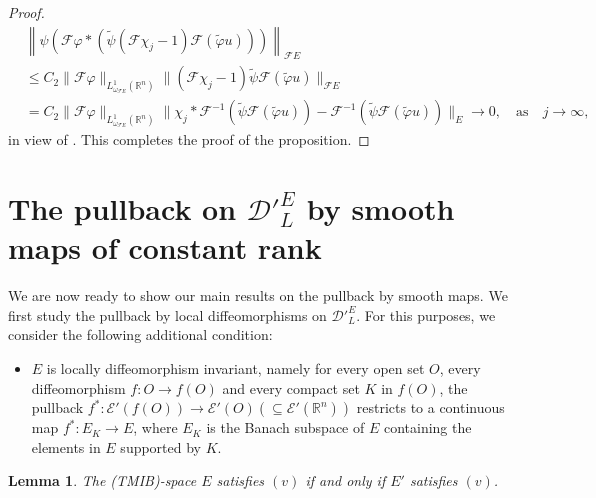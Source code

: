 \documentclass[12pt,reqno]{amsart}
\newcommand{\RR}{\mathbb R}
\newcommand{\EE}{\mathcal E}
\newcommand{\DD}{\mathcal D}
\theoremstyle{plain}
\newtheorem{lemma}[theorem]{Lemma}
\theoremstyle{remark}
\theoremstyle{definition}
\numberwithin{equation}{section}
\begin{document}
\begin{proof}
\begin{align*}
&\left\|\psi\left(\mathcal{F}\varphi*\left(\widetilde{\psi}(\mathcal{F}\chi_j-1) \mathcal{F}(\widetilde{\varphi}u)\right)\right)\right\|_{\mathcal{F}E}\\
&\leq C_2\|\mathcal{F}\varphi\|_{L^1_{\omega_{\mathcal{F}E}}(\RR^n)} \|(\mathcal{F}\chi_j-1)\widetilde{\psi}\mathcal{F}(\widetilde{\varphi}u)\|_{\mathcal{F}E}\\
&=C_2\|\mathcal{F}\varphi\|_{L^1_{\omega_{\mathcal{F}E}}(\RR^n)} \|\chi_j*\mathcal{F}^{-1}(\widetilde{\psi}\mathcal{F}(\widetilde{\varphi}u))- \mathcal{F}^{-1}(\widetilde{\psi}\mathcal{F}(\widetilde{\varphi}u))\|_E\rightarrow0,\quad \mbox{as}\quad j\rightarrow\infty,
\end{align*}
in view of \cite[Corollary 1]{DPV}. This completes the proof of the proposition.
\end{proof}



\section{The pullback on $\DD'^E_L$ by smooth maps of constant rank}\label{Sec2}


We are now ready to show our main results on the pullback by smooth maps. We first study the pullback by local diffeomorphisms on $\DD'^E_L$. For this purposes, we consider the following additional condition:
\begin{itemize}
\item[$(v)$] $E$ is locally diffeomorphism invariant, namely for every open set $O$, every diffeomorphism $f:O\rightarrow f(O)$ and every compact set $K$ in $f(O)$, the pullback $f^*:\EE'(f(O))\rightarrow\EE'(O)(\subseteq \EE'(\RR^n))$ restricts to a continuous map $f^*:E_K\rightarrow E$, where $E_K$ is the Banach subspace of $E$ containing the elements in $E$ supported by $K$.
\end{itemize}

\begin{lemma}\label{lem-for-diffinvorskl}
The (TMIB)-space $E$ satisfies $(v)$ if and only if $E'$ satisfies $(v)$.
\end{lemma}
\end{document}
